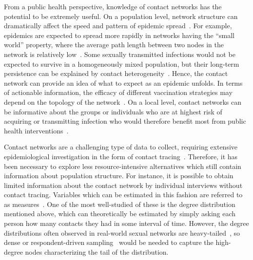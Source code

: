 From a public health perspective, knowledge of contact networks has the
potential to be extremely useful. On a population level, network structure can
dramatically affect the speed and pattern of epidemic
spread~\autocite[\eg][]{barthelemy2005dynamical, volz2008sir}. For example,
epidemics are expected to spread more rapidly in networks having the ``small
world'' property, where the average path length between two nodes in the
network is relatively low~\autocite{watts1998collective}. Some sexually
transmitted infections would not be expected to survive in a homogeneously
mixed population, but their long-term persistence can be explained by contact
heterogeneity~\autocite{anderson1992infectious, pastor2001epidemic}. Hence, the
contact network can provide an idea of what to expect as an epidemic unfolds.
In terms of actionable information, the efficacy of different vaccination
strategies may depend on the topology of the
network~\autocite{keeling2005networks,peng2013vaccination, ma2013importance,
rushmore2014network}. On a local level, contact networks can be informative
about the groups or individuals who are at highest risk of acquiring or
transmitting infection who would therefore benefit most from public health
interventions~\autocite{wang2015targeting, little2014using}.

Contact networks are a challenging type of data to collect, requiring extensive
epidemiological investigation in the form of contact
tracing~\autocite{morris1993epidemiology, welch2011statistical,
keeling2005networks, eames2015six}. Therefore, it has been necessary to explore
less resource-intensive alternatives which still contain information about
population structure. For instance, it is possible to obtain limited
information about the contact network by individual interviews without contact
tracing. Variables which can be estimated in this fashion are referred to as
 measures~\autocite{wasserman1994social}. One of the most
well-studied of these is the degree distribution mentioned above, which can
theoretically be estimated by simply asking each person how many contacts they
had in some interval of time. However, the degree distributions often observed
in real-world sexual networks are heavy-tailed~\autocite{liljeros2001web,
schneeberger2004scale, colgate1989risk}, so dense or respondent-driven
sampling~\autocite{heckathorn1997respondent} would be needed to capture the
high-degree nodes characterizing the tail of the distribution.

